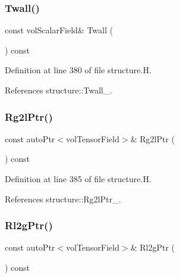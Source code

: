\subsubsection{\texorpdfstring{Twall()}{Twall()}}
{\footnotesize\ttfamily const vol\+Scalar\+Field\& Twall (\begin{DoxyParamCaption}{ }\end{DoxyParamCaption}) const\hspace{0.3cm}{\ttfamily [inline]}}



Definition at line 380 of file structure.\+H.



References structure\+::\+Twall\+\_\+.

\mbox{\label{classFoam_1_1structure_a96bcfb58cf44353ee1cc244bb6a3733c}} 
\subsubsection{\texorpdfstring{Rg2l\+Ptr()}{Rg2lPtr()}}
{\footnotesize\ttfamily const auto\+Ptr$<$vol\+Tensor\+Field$>$\& Rg2l\+Ptr (\begin{DoxyParamCaption}{ }\end{DoxyParamCaption}) const\hspace{0.3cm}{\ttfamily [inline]}}



Definition at line 385 of file structure.\+H.



References structure\+::\+Rg2l\+Ptr\+\_\+.

\mbox{\label{classFoam_1_1structure_a3104e223423d689b72e514aee2850df6}} 
\subsubsection{\texorpdfstring{Rl2g\+Ptr()}{Rl2gPtr()}}
{\footnotesize\ttfamily const auto\+Ptr$<$vol\+Tensor\+Field$>$\& Rl2g\+Ptr (\begin{DoxyParamCaption}{ }\end{DoxyParamCaption}) const\hspace{0.3cm}{\ttfamily [inline]}}



